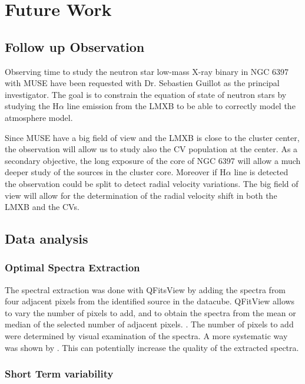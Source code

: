 \chapter{Future Work}\label{chap:future}
\thispagestyle{fancy}

\section{Follow up Observation}

Observing time to study  the neutron star low-mass X-ray binary in NGC 6397 with MUSE have been requested with Dr. Sebastien Guillot as the principal investigator. The goal is to constrain the equation of state of neutron stars by studying the H$\alpha$ line emission from the LMXB to be able to correctly model the atmosphere model. 

 Since MUSE have a big field of view and the LMXB is close to the cluster center, the observation will allow us to study also the CV population at the center. As a secondary objective, the long exposure of the core of NGC 6397 will allow a much deeper study of the sources in the cluster core. Moreover if H$\alpha$ line is detected the observation could be split to detect radial velocity variations. The big field of view will allow for the determination of the radial velocity shift in both the LMXB and the CVs.  
    
\section{Data analysis}

\subsection{Optimal Spectra Extraction}

The spectral extraction was done with QFitsView by adding the spectra from four adjacent pixels from the identified source in the datacube. QFitView allows to vary the number of pixels to add, and to obtain the spectra from the mean or median of the selected number of adjacent pixels. . The number of pixels to add were determined by visual examination of the spectra. A more systematic way was shown by \cite{horne_emission_1986}. This can potentially increase the quality of the extracted spectra. 

\subsection{Short Term variability}

